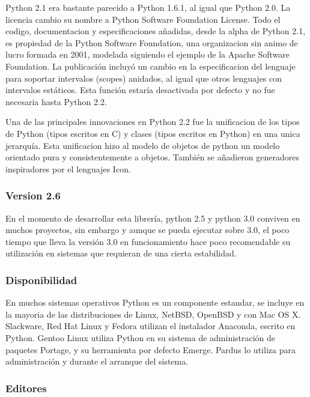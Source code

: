 \documentclass[a4paper,spanish,12pt]{book}
\begin{document}
Python 2.1 era bastante parecido a Python 1.6.1, al igual que Python 2.0. La licencia cambio su nombre a Python Software Foundation License. Todo el codigo, documentacion y especificaciones añadidas, desde la alpha de Python 2.1, es propiedad de la Python Software Foundation, una organizacion sin animo de lucro formada en 2001, modelada siguiendo el ejemplo de la Apache Software Foundation. La publicación incluyó un cambio en la especificacion del lenguaje para soportar intervalos (scopes) anidados, al igual que otros lenguajes con intervalos estáticos. Esta función estaría desactivada por defecto y no fue necesaria hasta Python 2.2.

Una de las principales innovaciones en Python 2.2 fue la unificacion de los tipos de Python (tipos escritos en C) y clases (tipos escritos en Python) en una unica jerarquía. Esta unificacion hizo al modelo de objetos de python un modelo orientado pura y consistentemente a objetos. Tambi\'en se añadieron generadores inspiradores por el lenguajes Icon.

\subsubsection{Version 2.6}

En el momento de desarrollar esta librería, python 2.5 y python 3.0 conviven en muchos proyectos, sin embargo y aunque se pueda ejecutar sobre 3.0, el poco tiempo que lleva la versión 3.0 en funcionamiento hace poco recomendable su utilización en sistemas que requieran de una cierta estabilidad.

\subsubsection{Disponibilidad}

En muchos sistemas operativos Python es un componente estandar, se incluye en la mayoria de las distribuciones de Linux, NetBSD, OpenBSD y con Mac OS X. Slackware, Red Hat Linux y Fedora utilizan el instalador Anaconda, escrito en Python. Gentoo Linux utiliza Python en su sistema de administración de paquetes Portage, y su herramienta por defecto Emerge. Pardus lo utiliza para administración y durante el arranque del sistema.

\subsubsection{Editores}
\end{document}

